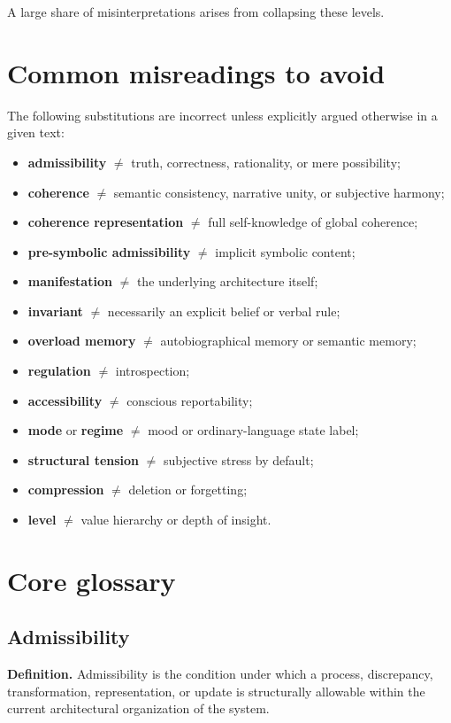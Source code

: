 \documentclass[11pt,a4paper]{article}
\begin{document}
	A large share of misinterpretations arises from collapsing these levels.
	
	\section{Common misreadings to avoid}
	
	The following substitutions are incorrect unless explicitly argued otherwise in a given text:
	\begin{itemize}[leftmargin=2em]
		\item \textbf{admissibility} $\neq$ truth, correctness, rationality, or mere possibility;
		\item \textbf{coherence} $\neq$ semantic consistency, narrative unity, or subjective harmony;
		\item \textbf{coherence representation} $\neq$ full self-knowledge of global coherence;
		\item \textbf{pre-symbolic admissibility} $\neq$ implicit symbolic content;
		\item \textbf{manifestation} $\neq$ the underlying architecture itself;
		\item \textbf{invariant} $\neq$ necessarily an explicit belief or verbal rule;
		\item \textbf{overload memory} $\neq$ autobiographical memory or semantic memory;
		\item \textbf{regulation} $\neq$ introspection;
		\item \textbf{accessibility} $\neq$ conscious reportability;
		\item \textbf{mode} or \textbf{regime} $\neq$ mood or ordinary-language state label;
		\item \textbf{structural tension} $\neq$ subjective stress by default;
		\item \textbf{compression} $\neq$ deletion or forgetting;
		\item \textbf{level} $\neq$ value hierarchy or depth of insight.
	\end{itemize}
	
	\section{Core glossary}
	
	\subsection{Admissibility}
	
	\textbf{Definition.} Admissibility is the condition under which a process, discrepancy, transformation, representation, or update is structurally allowable within the current architectural organization of the system.
	
\end{document}

